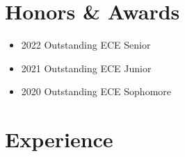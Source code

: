 \documentclass{article}
\begin{document}
\begin{comment}
		\subsection{Spring 2020}
			\begin{itemize}
				\item ENGR-2614 Electrical Circuit Analysis
				\item ENGR-2123 ECE Mathematics II
			\end{itemize}
		\subsection{Fall 2019}
			\begin{itemize}
				\item ENGR-2544 Introductory Digital Systems Design
				\item CMSC-2133 Object Oriented Programming
			\end{itemize}
		\subsection{Spring 2019}
			\begin{itemize}
				\item ENGR-2113 ECE Mathematics I
				\item ENGR-1242 Engineering Fundamentals
				\item CMSC-1123 Programming II
			\end{itemize}
		\subsection{Fall 2018}
			\begin{itemize}
				\item CMSC-1113 Programming I
				\item ENGR-1122 Engineering Computing
			\end{itemize}
\end{comment}

\section{Honors \& Awards}
	\begin{itemize}
		\item 2022 Outstanding ECE Senior
		\item 2021 Outstanding ECE Junior
		\item 2020 Outstanding ECE Sophomore
	\end{itemize}
\section{Experience}
\end{document}
